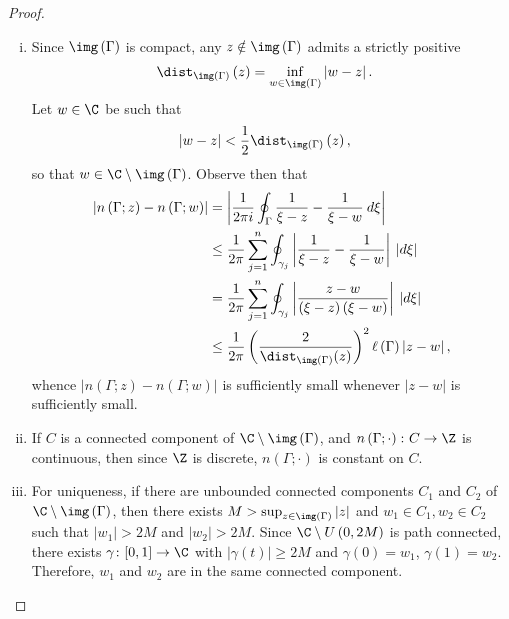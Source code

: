 \documentclass[10pt]{mypackage}
\begin{document}
\begin{proof}\hfill
  \begin{enumerate}[(i)]
    \item Since $ \img\left( \Gamma \right) $ is compact, any $z\notin \img\left( \Gamma \right)$ admits a strictly positive
      \begin{align*}
        \dist_{\img\left( \Gamma \right)}\left( z \right) &= \inf_{w\in\img\left( \Gamma \right)} \left\vert w-z \right\vert.
      \end{align*}
      Let $w\in\C$ be such that
      \begin{align*}
        \left\vert w-z \right\vert &< \frac{1}{2}\dist_{\img\left( \Gamma \right)}\left( z \right),
      \end{align*}
      so that $w\in \C\setminus \img\left( \Gamma \right)$. Observe then that
      \begin{align*}
        \left\vert n\left( \Gamma;z \right)-n\left( \Gamma;w \right) \right\vert &= \left\vert \frac{1}{2\pi i} \oint_{\Gamma}^{} \frac{1}{\xi-z} - \frac{1}{\xi-w}\:d\xi \right\vert\\
                                                                                 &\leq \frac{1}{2\pi} \sum_{j=1}^{n} \oint_{\gamma_j}^{} \left\vert \frac{1}{\xi-z} - \frac{1}{\xi-w} \right\vert \:\left\vert d\xi \right\vert\\
                                                                                 &= \frac{1}{2\pi} \sum_{j=1}^{n} \oint_{\gamma_j}^{} \left\vert \frac{z-w}{\left( \xi-z \right)\left( \xi-w \right)} \right\vert\:\left\vert d\xi \right\vert\\
                                                                                 &\leq \frac{1}{2\pi} \left( \frac{2}{\dist_{\img\left( \Gamma \right)}(z)} \right)^2 \ell\left( \Gamma \right)\left\vert z-w \right\vert,
      \end{align*}
      whence $\left\vert n\left( \Gamma;z \right)-n\left( \Gamma;w \right) \right\vert$ is sufficiently small whenever $\left\vert z-w \right\vert$ is sufficiently small.
    \item If $C$ is a connected component of $\C\setminus\img\left( \Gamma \right)$, and $n\left( \Gamma;\cdot \right)\colon C\rightarrow \Z$ is continuous, then since $\Z$ is discrete, $n\left( \Gamma;\cdot \right)$ is constant on $C$.
    \item For uniqueness, if there are unbounded connected components $C_1$ and $C_2$ of $\C\setminus \img\left( \Gamma \right)$, then there exists $M > \sup_{z\in\img\left( \Gamma \right)}\left\vert z \right\vert$ and $w_1\in C_1,w_2\in C_2$ such that $\left\vert w_1 \right\vert > 2M$ and $\left\vert w_2 \right\vert > 2M$. Since $\C\setminus U\left( 0,2M \right)$ is path connected, there exists $\gamma\colon [0,1]\rightarrow \C$ with $\left\vert \gamma(t) \right\vert \geq 2M$ and $\gamma(0) = w_1$, $\gamma(1) = w_2$. Therefore, $w_1$ and $w_2$ are in the same connected component.%


\end{enumerate}
\end{proof}
\end{document}
